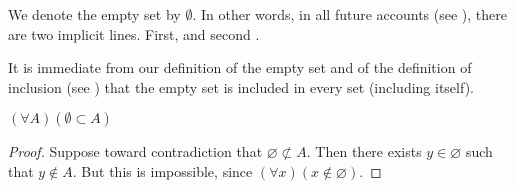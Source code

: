 We denote the empty set by $\emptyset$.
In other words, in all future accounts (see ), there are two implicit lines. First,  and second .


It is immediate from our definition of the empty set and of the definition of inclusion (see ) that the empty set is included in every set (including itself).

\begin{proposition}
	$(\forall A)(\emptyset \subset A)$
\end{proposition}
\begin{proof}
	Suppose toward contradiction that $\varnothing \not\subset A$.
	Then there exists $y \in \varnothing$ such that $y \not \in A$.
	But this is impossible, since $(\forall x)(x \not \in \varnothing)$.
\end{proof}
